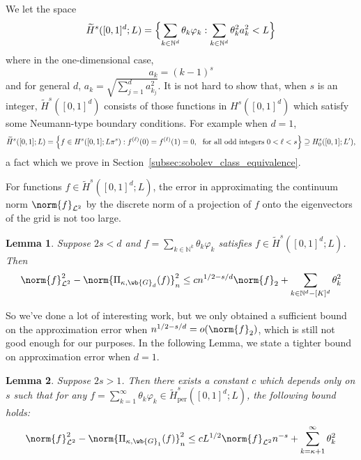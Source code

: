 \documentclass{article}
\newcommand{\1}{\mathbf{1}}
\newcommand{\Leb}{\mathcal{L}}
\newcommand{\wt}[1]{\widetilde{#1}}
\theoremstyle{alden}
\theoremstyle{aldenthm}
\newtheorem{lemma}{Lemma}
\theoremstyle{definition}
\theoremstyle{remark}
\begin{document}
We let the space 
\begin{equation*}
\wt{H}^{s}([0,1]^d;L) = \Bigl\{ \sum_{k \in \mathbb{N}^d} \theta_k \varphi_k: \sum_{k \in \mathbb{N}^d} \theta_k^2 a_k^{2} < L \Bigr\}
\end{equation*}
where in the one-dimensional case,
\begin{equation*}
a_{k} = (k - 1)^s
\end{equation*}
and for general $d$, $a_k = \sqrt{\sum_{j = 1}^{d} a_{k_j}^2}$. It is not hard to show that, when $s$ is an integer, $\wt{H}^s([0,1]^d)$ consists of those functions in $H^s([0,1]^d)$ which satisfy some Neumann-type boundary conditions. For example when $d = 1$,
\begin{equation*}
\wt{H}^s([0,1];L) = \Bigl\{f \in H^{s}([0,1];L \pi^{s}): f^{(\ell)}(0) = f^{(\ell)}(1) = 0,~~\textrm{for all odd integers $0 < \ell < s$} \Bigr \} \supseteq H_0^s([0,1];L'),
\end{equation*}
a fact which we prove in Section~\ref{subsec:sobolev_class_equivalence}.

For functions $f \in \wt{H}^{s}([0,1]^d;L)$, the error in approximating the continuum norm $\norm{f}_{\Leb^2}$ by the discrete norm of a projection of $f$ onto the eigenvectors of the grid is not too large. 

\begin{lemma}
	\label{lem:grid_sobolev_approximation_error_4}
	Suppose $2s < d$ and $f = \sum_{k \in \mathbb{N}^k} \theta_k \varphi_k$ satisfies $f \in \wt{H}^{s}([0,1]^d;L)$. Then
	\begin{equation*}
	\norm{f}_{\Leb^2}^2 - \norm{\Pi_{\kappa,\wb{G}_d}(f)}_{n}^2 \leq c n^{1/2 - s/d} \norm{f}_2 + \sum_{k \in \mathbb{N}^d - [K]^d} \theta_k^2
	\end{equation*}
\end{lemma}

So we've done a lot of interesting work, but we only obtained a sufficient bound on the approximation error when $n^{1/2 - s/d} = o(\norm{f}_2)$, which is still not good enough for our purposes. In the following Lemma, we state a tighter bound on approximation error when $d = 1$.
\begin{lemma}
	\label{lem:grid_sobolev_approximation_error_5}
	Suppose $2s > 1$. Then there exists a constant $c$ which depends only on $s$ such that for any $f = \sum_{k = 1}^{\infty} \theta_k \varphi_k \in \wt{H}_{\textrm{per}}^{s}([0,1]^d;L)$, the following bound holds:
	\begin{equation*}
	\norm{f}_{\Leb^2}^2 - \norm{\Pi_{\kappa,\wb{G}_1}(f)}_{n}^2 \leq c L^{1/2} \norm{f}_{\Leb^2} n^{-s} + \sum_{k = \kappa + 1}^{\infty} \theta_k^2
	\end{equation*} 
\end{lemma}
\end{document}
